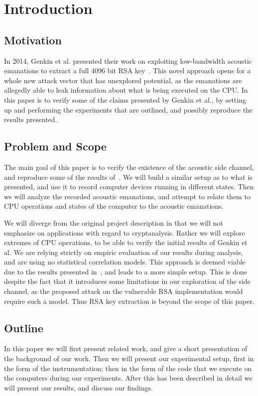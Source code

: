 \chapter{Introduction}\label{chp:introduction} 

\section{Motivation}
In 2014, Genkin et al. presented their work on exploiting low-bandwidth acoustic emanations to extract a full 4096 bit RSA key~\cite{DBLP:conf/crypto/GenkinST14}.
This novel approach opens for a whole new attack vector that has unexplored potential, as the emanations are allegedly able to leak information about what is being executed on the CPU.
In this paper is to verify some of the claims presented by Genkin et al., by setting up and performing the experiments that are outlined, and possibly reproduce the results presented.

\section{Problem and Scope}
The main goal of this paper is to verify the existence of the acoustic side channel, and reproduce some of the results of~\cite{DBLP:conf/crypto/GenkinST14}.
We will build a similar setup as to what is presented, and use it to record computer devices running in different states.
Then we will analyze the recorded acoustic emanations, and attempt to relate them to CPU operations and states of the computer to the acoustic emanations.

We will diverge from the original project description in that we will not emphasize on applications with regard to cryptanalysis.
Rather we will explore extremes of CPU operations, to be able to verify the initial results of Genkin et al.
We are relying strictly on empiric evaluation of our results during analysis, and are using no statistical correlation models.
This approach is deemed viable due to the results presented in~\cite{DBLP:conf/crypto/GenkinST14}, and leads to a more simple setup.
This is done despite the fact that it introduces some limitations in our exploration of the side channel, as the proposed attack on the vulnerable RSA implementation would require such a model.
Thus RSA key extraction is beyond the scope of this paper.



\section{Outline}
In this paper we will first present related work, and give a short presentation of the background of our work.
Then we will present our experimental setup, first in the form of the instrumentation; then in the form of the code that we execute on the computers during our experiments.
After this has been described in detail we will present our results, and discuss our findings.